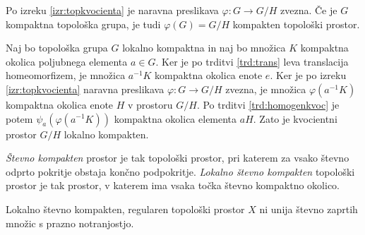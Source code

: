 \documentclass[mat1]{fmfdelo}
\begin{document}
\begin{dokaz}
Po izreku \ref{izr:topkvocienta} je naravna preslikava $\varphi\colon G \to G/H$ zvezna. Če je $G$ kompaktna topološka grupa, je tudi $\varphi(G) = G/H$ kompakten topološki prostor.

Naj bo topološka grupa $G$ lokalno kompaktna in naj bo množica $K$ kompaktna okolica poljubnega elementa $a \in G$. Ker je po trditvi \ref{trd:trans} leva translacija homeomorfizem, je množica $a^{-1}K$ kompaktna okolica enote $e$. Ker je po izreku \ref{izr:topkvocienta} naravna preslikava $\varphi\colon G \to G/H$ zvezna, je množica $\varphi(a^{-1}K)$ kompaktna okolica enote $H$ v prostoru $G/H$. Po trditvi \ref{trd:homogenkvoc} je potem $\psi_a(\varphi(a^{-1}K))$ kompaktna okolica elementa $aH$. Zato je kvocientni prostor $G/H$ lokalno kompakten.
\end{dokaz}

\begin{definicija}
\emph{Števno kompakten} prostor je tak topološki prostor, pri katerem za vsako števno odprto pokritje obstaja končno podpokritje. \emph{Lokalno števno kompakten} topološki prostor je tak prostor, v katerem ima vsaka točka števno kompaktno okolico. 
\end{definicija}

\begin{trditev}\label{trd:kompni}
Lokalno števno kompakten, regularen topološki prostor $X$ ni unija števno zaprtih množic s prazno notranjostjo.
\end{trditev}
\end{document}
